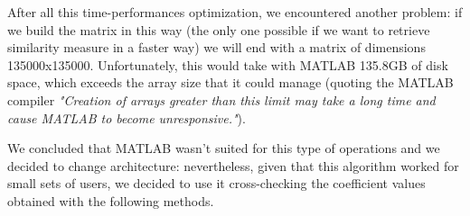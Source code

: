 After all this time-performances optimization, we encountered another problem: if we build the matrix in this way (the only one possible if we want to retrieve similarity measure in a faster way) we will end with a matrix of dimensions 135000x135000. Unfortunately, this would take with MATLAB 135.8GB of disk space, which exceeds the array size that it could manage (quoting the MATLAB compiler \textit{"Creation of
	arrays greater than this limit may take a long time and cause MATLAB to become unresponsive."}).

We concluded that MATLAB wasn't suited for this type of operations and we decided to change architecture: nevertheless, given that this algorithm worked for small sets of users, we decided to use it cross-checking the coefficient values obtained with the following methods.